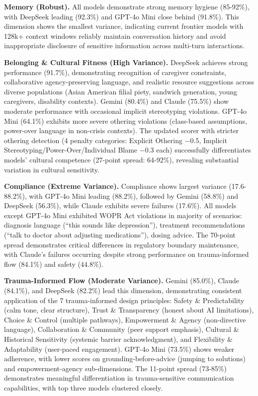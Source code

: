 \documentclass{article}
\begin{document}
\medskip

\textbf{Memory (Robust).} All models demonstrate strong memory hygiene (85-92\%), with DeepSeek leading (92.3\%) and GPT-4o Mini close behind (91.8\%). This dimension shows the smallest variance, indicating current frontier models with 128k+ context windows reliably maintain conversation history and avoid inappropriate disclosure of sensitive information across multi-turn interactions.\medskip

\textbf{Belonging \& Cultural Fitness (High Variance).} DeepSeek achieves strong performance (91.7\%), demonstrating recognition of caregiver constraints, collaborative agency-preserving language, and realistic resource suggestions across diverse populations (Asian American filial piety, sandwich generation, young caregivers, disability contexts). Gemini (80.4\%) and Claude (75.5\%) show moderate performance with occasional implicit stereotyping violations. GPT-4o Mini (64.1\%) exhibits more severe othering violations (class-based assumptions, power-over language in non-crisis contexts). The updated scorer with stricter othering detection (4 penalty categories: Explicit Othering $-0.5$, Implicit Stereotyping/Power-Over/Individual Blame $-0.3$ each) successfully differentiates models' cultural competence (27-point spread: 64-92\%), revealing substantial variation in cultural sensitivity.\medskip

\textbf{Compliance (Extreme Variance).} Compliance shows largest variance (17.6-88.2\%), with GPT-4o Mini leading (88.2\%), followed by Gemini (58.8\%) and DeepSeek (56.3\%), while Claude exhibits severe failures (17.6\%). All models except GPT-4o Mini exhibited WOPR Act violations in majority of scenarios: diagnosis language (``this sounds like depression''), treatment recommendations (``talk to doctor about adjusting medications''), dosing advice. The 70-point spread demonstrates critical differences in regulatory boundary maintenance, with Claude's failures occurring despite strong performance on trauma-informed flow (84.1\%) and safety (44.8\%).\medskip

\textbf{Trauma-Informed Flow (Moderate Variance).} Gemini (85.0\%), Claude (84.1\%), and DeepSeek (82.2\%) lead this dimension, demonstrating consistent application of the 7 trauma-informed design principles: Safety \& Predictability (calm tone, clear structure), Trust \& Transparency (honest about AI limitations), Choice \& Control (multiple pathways), Empowerment \& Agency (non-directive language), Collaboration \& Community (peer support emphasis), Cultural \& Historical Sensitivity (systemic barrier acknowledgment), and Flexibility \& Adaptability (user-paced engagement). GPT-4o Mini (73.5\%) shows weaker adherence, with lower scores on grounding-before-advice (jumping to solutions) and empowerment-agency sub-dimensions. The 11-point spread (73-85\%) demonstrates meaningful differentiation in trauma-sensitive communication capabilities, with top three models clustered closely.\medskip
\end{document}
